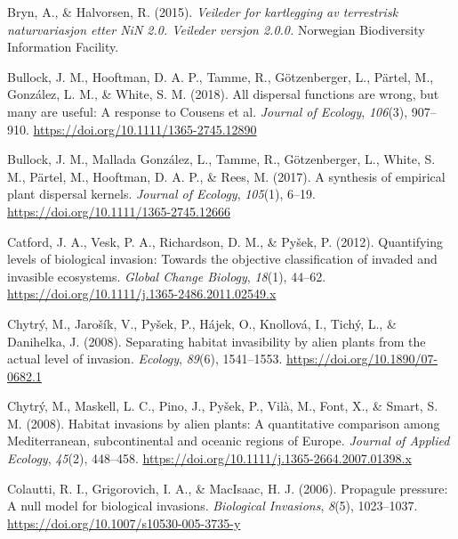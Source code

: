 \documentclass[
]{article}
\begin{document}
\leavevmode\hypertarget{ref-brynVeilederKartleggingAv2015}{}%
Bryn, A., \& Halvorsen, R. (2015). \emph{Veileder for kartlegging av terrestrisk naturvariasjon etter NiN 2.0. Veileder versjon 2.0.0.} Norwegian Biodiversity Information Facility.

\leavevmode\hypertarget{ref-bullockAllDispersalFunctions2018}{}%
Bullock, J. M., Hooftman, D. A. P., Tamme, R., Götzenberger, L., Pärtel, M., González, L. M., \& White, S. M. (2018). All dispersal functions are wrong, but many are useful: A response to Cousens et al. \emph{Journal of Ecology}, \emph{106}(3), 907--910. \url{https://doi.org/10.1111/1365-2745.12890}

\leavevmode\hypertarget{ref-bullockSynthesisEmpiricalPlant2017}{}%
Bullock, J. M., Mallada González, L., Tamme, R., Götzenberger, L., White, S. M., Pärtel, M., Hooftman, D. A. P., \& Rees, M. (2017). A synthesis of empirical plant dispersal kernels. \emph{Journal of Ecology}, \emph{105}(1), 6--19. \url{https://doi.org/10.1111/1365-2745.12666}

\leavevmode\hypertarget{ref-catfordQuantifyingLevelsBiological2012}{}%
Catford, J. A., Vesk, P. A., Richardson, D. M., \& Pyšek, P. (2012). Quantifying levels of biological invasion: Towards the objective classification of invaded and invasible ecosystems. \emph{Global Change Biology}, \emph{18}(1), 44--62. \url{https://doi.org/10.1111/j.1365-2486.2011.02549.x}

\leavevmode\hypertarget{ref-chytrySeparatingHabitatInvasibility2008}{}%
Chytrý, M., Jarošík, V., Pyšek, P., Hájek, O., Knollová, I., Tichý, L., \& Danihelka, J. (2008). Separating habitat invasibility by alien plants from the actual level of invasion. \emph{Ecology}, \emph{89}(6), 1541--1553. \url{https://doi.org/10.1890/07-0682.1}

\leavevmode\hypertarget{ref-chytryHabitatInvasionsAlien2008}{}%
Chytrý, M., Maskell, L. C., Pino, J., Pyšek, P., Vilà, M., Font, X., \& Smart, S. M. (2008). Habitat invasions by alien plants: A quantitative comparison among Mediterranean, subcontinental and oceanic regions of Europe. \emph{Journal of Applied Ecology}, \emph{45}(2), 448--458. \url{https://doi.org/10.1111/j.1365-2664.2007.01398.x}

\leavevmode\hypertarget{ref-colauttiPropagulePressureNull2006}{}%
Colautti, R. I., Grigorovich, I. A., \& MacIsaac, H. J. (2006). Propagule pressure: A null model for biological invasions. \emph{Biological Invasions}, \emph{8}(5), 1023--1037. \url{https://doi.org/10.1007/s10530-005-3735-y}
\end{document}

